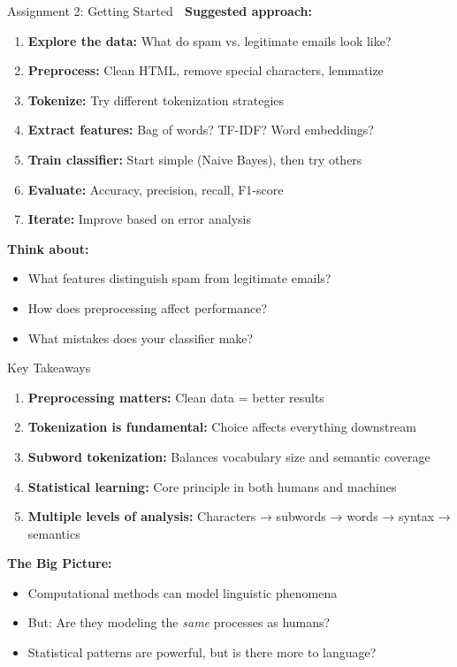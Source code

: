 \documentclass[aspectratio=169]{beamer}
\begin{document}
\begin{frame}[shrink=10]{Assignment 2: Getting Started 🚀}
    \textbf{Suggested approach:}
    \begin{enumerate}\setlength{\itemsep}{0pt}
        \item \textbf{Explore the data:} What do spam vs. legitimate emails look like?
        \item \textbf{Preprocess:} Clean HTML, remove special characters, lemmatize
        \item \textbf{Tokenize:} Try different tokenization strategies
        \item \textbf{Extract features:} Bag of words? TF-IDF? Word embeddings?
        \item \textbf{Train classifier:} Start simple (Naive Bayes), then try others
        \item \textbf{Evaluate:} Accuracy, precision, recall, F1-score
        \item \textbf{Iterate:} Improve based on error analysis
    \end{enumerate}

    \vspace{0.5em}
    \textbf{Think about:}
    \begin{itemize}\setlength{\itemsep}{0pt}
        \item What features distinguish spam from legitimate emails?
        \item How does preprocessing affect performance?
        \item What mistakes does your classifier make?
    \end{itemize}
\end{frame}

\begin{frame}[shrink=10]{Key Takeaways 🎯}
    \begin{enumerate}\setlength{\itemsep}{0pt}
        \item \textbf{Preprocessing matters:} Clean data = better results
        \item \textbf{Tokenization is fundamental:} Choice affects everything downstream
        \item \textbf{Subword tokenization:} Balances vocabulary size and semantic coverage
        \item \textbf{Statistical learning:} Core principle in both humans and machines
        \item \textbf{Multiple levels of analysis:} Characters → subwords → words → syntax → semantics
    \end{enumerate}

    \vspace{1em}
    \textbf{The Big Picture:}
    \begin{itemize}\setlength{\itemsep}{0pt}
        \item Computational methods can model linguistic phenomena
        \item But: Are they modeling the \textit{same} processes as humans?
        \item Statistical patterns are powerful, but is there more to language?
    \end{itemize}
\end{frame}
\end{document}
